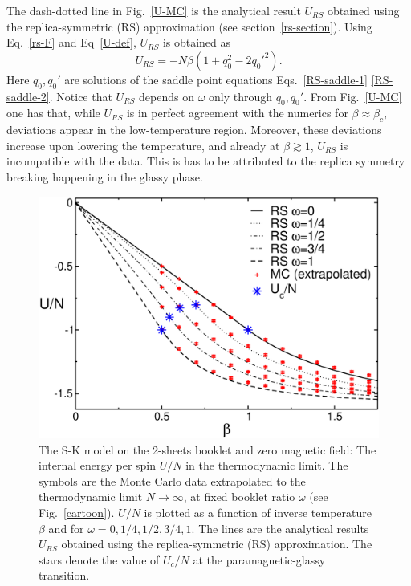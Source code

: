 \documentclass[twocolumn,superscriptaddress,prb,10pt]{revtex4-1}
\begin{document}
The dash-dotted line in Fig.~\ref{U-MC} is the analytical result $U_{RS}$ obtained using 
the replica-symmetric (RS) approximation (see section~\ref{rs-section}). 
Using Eq.~\eqref{rs-F} and Eq~\eqref{U-def}, $U_{RS}$  is obtained as   
%
\begin{equation}
U_{RS}=-N\beta(1+q_0^2-2q_0'^2). 
\label{U}
\end{equation}
% 
Here $q_0,q_0'$ are solutions of the saddle point equations Eqs.~\eqref{RS-saddle-1}
\eqref{RS-saddle-2}. Notice that $U_{RS}$ depends on $\omega$ only through $q_0,q_0'$. 
From Fig.~\ref{U-MC} one has that, while $U_{RS}$ is in perfect agreement with the numerics 
for $\beta\approx\beta_c$, deviations appear in the low-temperature region. Moreover, these 
deviations increase upon lowering the temperature, and already at $\beta\gtrsim 1$, $U_{RS}$ 
is incompatible with the data. This is has to be attributed to the replica symmetry breaking 
happening in the glassy phase. 

\begin{figure}[t]
\includegraphics*[width=0.93\linewidth]{./draft_figs/U_extrapolated}
\caption{
 The S-K model on the 2-sheets booklet and zero magnetic field: 
 The internal energy per spin $U/N$ in the thermodynamic limit. 
 The symbols are the Monte Carlo data extrapolated to the thermodynamic 
 limit $N\to\infty$, at fixed booklet ratio $\omega$ (see Fig.~\ref{cartoon}).  
 $U/N$ is plotted as a function of inverse temperature $\beta$ and for 
 $\omega=0,1/4,1/2,3/4,1$. The lines are the analytical results $U_{RS}$ 
 obtained using the replica-symmetric (RS) approximation. The stars denote 
 the value of $U_c/N$ at the paramagnetic-glassy transition. 
}
\label{U-RS}
\end{figure}
\end{document}

